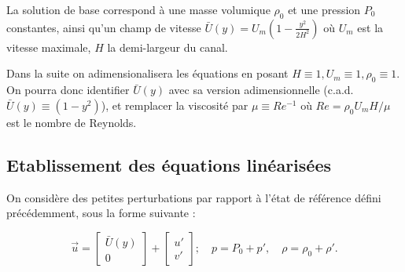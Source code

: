 \documentclass[a4paper,11pt]{article}
\begin{document}
La solution de base correspond à une masse volumique $\rho_0$ et une pression $P_0$ constantes, ainsi qu'un champ de vitesse 
$\bar{U}(y) = U_m \left( 1 - \frac{y^2}{2 H^2} \right)$ où $U_m$ est la vitesse maximale, $H$ la demi-largeur du canal. 
 
Dans la suite on adimensionalisera les équations en posant $H \equiv 1,U_m \equiv 1, \rho_0 \equiv 1$. On pourra donc identifier $\bar{U}(y)$ 
avec sa version adimensionnelle (c.a.d. $\bar{U}(y) \equiv (1-y^2)$), et 
remplacer la viscosité par $\mu \equiv Re^{-1}$ où $Re = \rho_0 U_m H/\mu$ est le nombre de Reynolds.
 
 
\subsection{ Etablissement des équations linéarisées } 

On considère des petites perturbations par rapport à l'état de référence défini précédemment, sous la forme suivante :

$$
\vec{u} = \left[ \begin{array}{c} \bar{U}(y) \\ 0  \end{array} \right] + \left[ \begin{array}{c} u' \\ v'  \end{array} \right] ;
\quad p = P_0 + p', \quad  \rho = \rho_0 + \rho'.
$$

\end{document}
